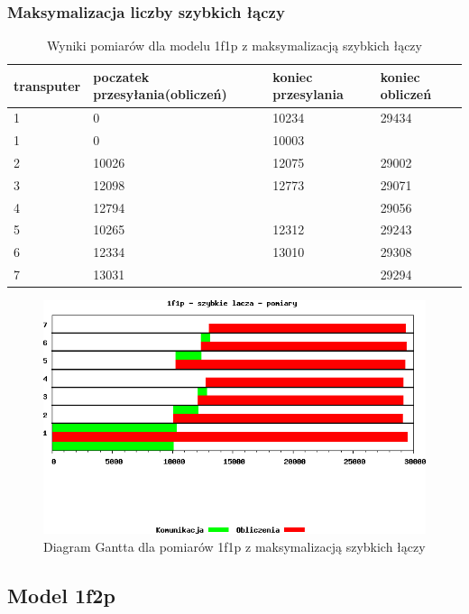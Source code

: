 \documentclass[a4paper,11pt, titlepage]{article}
\begin{document}
\subsubsection{Maksymalizacja liczby szybkich łączy}
\begin{table}[hp!]
\begin{tabular}{|l|l|l|l|}\hline
transputer & poczatek przesyłania(obliczeń) & koniec przesylania & koniec obliczeń\\ \hline
1&0&10234&29434\\ \hline
1&0&10003&\\ \hline
2&10026&12075&29002\\ \hline
3&12098&12773&29071\\ \hline
4&12794&&29056\\ \hline
5&10265&12312&29243\\ \hline
6&12334&13010&29308\\ \hline
7&13031&&29294\\ \hline
\end{tabular}
\caption{Wyniki pomiarów dla modelu 1f1p z maksymalizacją szybkich łączy \label{i1f1p_l}}
\end{table}
\begin{figure}[hp!]
\includegraphics[width=1.0\textwidth]{wykresy/i1p1f_lacza}
\caption{Diagram Gantta dla pomiarów 1f1p z maksymalizacją szybkich łączy \label{i1p1f_lg}}
\end{figure}
\subsection{Model 1f2p}
\end{document}
